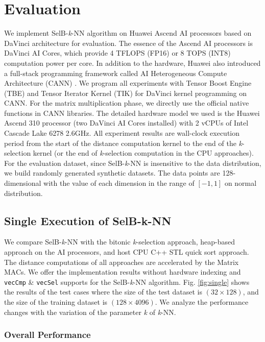 \section{Evaluation}

We implement SelB-\textit{k}-NN algorithm on Huawei Ascend AI processors based on DaVinci \cite{DBLP:conf/hotchips/LiaoTXZ19} architecture for evaluation. The essence of the Ascend AI processors is DaVinci AI Cores, which provide 4 TFLOPS (FP16) or 8 TOPS (INT8) computation power per core. In addition to the hardware, Huawei also introduced a full-stack programming framework called AI Heterogeneous Compute Architecture (CANN) \cite{CANN}. We program all experiments with Tensor Boost Engine (TBE) and Tensor Iterator Kernel (TIK) for DaVinci kernel programming on CANN. For the matrix multiplication phase, we directly use the official native functions in CANN libraries. The detailed hardware model we used is the Huawei Ascend 310 processor (two DaVinci AI Cores installed) with 2 vCPUs of Intel Cascade Lake 6278 2.6GHz. All experiment results are wall-clock execution period from the start of the distance computation kernel to the end of the \textit{k}-selection kernel (or the end of \textit{k}-selection computation in the CPU approaches). For the evaluation dataset, since SelB-\textit{k}-NN is insensitive to the data distribution, we build randomly generated synthetic datasets. The data points are 128-dimensional with the value of each dimension in the range of $[-1, 1]$ on normal distribution.

\subsection{Single Execution of SelB-k-NN}

We compare SelB-\textit{k}-NN with the bitonic \textit{k}-selection approach, heap-based approach on the AI processors, and host CPU C++ STL quick sort approach. The distance computations of all approaches are accelerated by the Matrix MACs. We offer the implementation results without hardware indexing and \verb|vecCmp| \& \verb|vecSel| supports for the SelB-\textit{k}-NN algorithm. Fig. \ref{fig:single} shows the results of the test cases where the size of the test dataset is $(32 \times 128)$, and the size of the training dataset is $(128 \times 4096)$. We analyze the performance changes with the variation of the parameter \textit{k} of \textit{k}-NN.

\subsubsection{Overall Performance}

